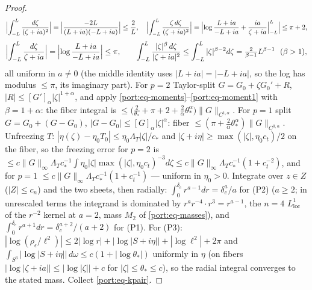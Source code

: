 \begin{proof}
\begin{equation}
  \Bigl|\int_{-L}^{L}\frac{d\zeta}{(\zeta+ia)^{2}}\Bigr|
  =\Bigl|\frac{-2L}{(L+ia)(-L+ia)}\Bigr|\le\frac{2}{L},\quad
  \Bigl|\int_{-L}^{L}\frac{\zeta\,d\zeta}{(\zeta+ia)^{2}}\Bigr|
  =\Bigl|\log\frac{L+ia}{-L+ia}+\frac{ia}{\zeta+ia}\Big|_{-L}^{L}\Bigr|
  \le\pi+2,
\end{equation}
\begin{equation}\label{port:eq-moment1}
  \Bigl|\int_{-L}^{L}\frac{d\zeta}{\zeta+ia}\Bigr|
  =\Bigl|\log\frac{L+ia}{-L+ia}\Bigr|\le\pi,\qquad
  \int_{-L}^{L}\frac{|\zeta|^{\beta}\,d\zeta}{|\zeta+ia|^{2}}
  \le\int_{-L}^{L}|\zeta|^{\beta-2}d\zeta
  =\tfrac{2}{\beta-1}L^{\beta-1}\ \ (\beta>1),
\end{equation}
all uniform in $a\ne0$ (the middle identity uses
$|L+ia|=|-L+ia|$, so the log has modulus $\le\pi$, its imaginary
part). For $p=2$ Taylor-split $G=G_0+\zeta G_0'+R$,
$|R|\le[G']_{\alpha}|\zeta|^{1+\alpha}$, and apply
\eqref{port:eq-moments}--\eqref{port:eq-moment1} with $\beta=1+\alpha$:
the fiber integral is $\le\bigl(\tfrac{2}{\theta_*}+\pi+2
+\tfrac{2}{\alpha}\theta_*^{\alpha}\bigr)\|G\|_{C^{1,\alpha}}$. For
$p=1$ split $G=G_0+(G-G_0)$, $|G-G_0|\le[G]_\alpha|\zeta|^\alpha$:
fiber $\le(\pi+\tfrac{2}{\alpha}\theta_*^{\alpha})\|G\|_{C^{0,\alpha}}$.
Unfreezing $T$: $|\eta(\zeta)-\eta_0T_0|\le\eta_0\Lambda_T|\zeta|/c_*$
and $|\zeta+i\eta|\ge\max(|\zeta|,\eta_0c_t)/2$ on the fiber, so the
freezing error for $p=2$ is
$\le c\|G\|_\infty\Lambda_T c_*^{-1}\int\eta_0|\zeta|
\max(|\zeta|,\eta_0c_t)^{-3}d\zeta\le
c\|G\|_\infty\Lambda_Tc_*^{-1}(1+c_t^{-2})$, and for $p=1$
$\le c\|G\|_\infty\Lambda_Tc_*^{-1}(1+c_t^{-1})$ --- uniform in
$\eta_0>0$. Integrate over $z\in Z$ ($|Z|\le c_n$) and the two sheets,
then radially: $\int_0^{\delta_c}r^{a-1}dr=\delta_c^{a}/a$ for (P2)
($a\ge2$; in unrescaled terms the integrand is dominated by
$r^{a}r^{-4}\cdot r^{3}=r^{a-1}$, the $n=4$ $L^1_{\mathrm{loc}}$ of the
$r^{-2}$ kernel at $a=2$, mass $M_2$ of \eqref{port:eq-masses}), and
$\int_0^{\delta_c}r^{a+1}dr=\delta_c^{a+2}/(a+2)$ for (P1). For (P3):
$|\log(\rho_\epsilon/\ell^2)|\le2|\log r|+|\log|S+i\eta||+
|{\log\ell^2}|+2\pi$ and $\int_{S^3}|\log|S+i\eta||\,d\omega\le
c(1+|\log\theta_*|)$ uniformly in $\eta$ (on fibers
$|\log|\zeta+ia||\le|\log|\zeta||+c$ for $|\zeta|\le\theta_*\le c$),
so the radial integral converges to the stated mass. Collect
\eqref{port:eq-kpair}.
\end{proof}

